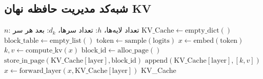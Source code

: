 \subsection{شبه‌کد مدیریت حافظه نهان KV}
\begin{latin}
\begin{algorithm}[H]
\caption{مدیریت حافظه نهان KV با تخصیص صفحه‌بندی شده}
\label{alg:kv_cache}
\begin{algorithmic}[1]
\Require $n$: تعداد لایه‌ها، $h$: تعداد سرها، $d_k$: بعد هر سر
\State $\text{KV\_Cache} \gets \text{empty\_dict}()$
\State $\text{block\_table} \gets \text{empty\_list}()$
    \State $\text{token} \gets \text{sample}(\text{logits})$
    \State $x \gets \text{embed}(\text{token})$
        \State $k, v \gets \text{compute\_kv}(x)$
            \State $\text{block\_id} \gets \text{alloc\_page}()$
            \State $\text{store\_in\_page}(\text{KV\_Cache}[\text{layer}], \text{block\_id})$
        \EndIf
        \State $\text{append}(\text{KV\_Cache}[\text{layer}], [k, v])$
        \State $x \gets \text{forward\_layer}(x, \text{KV\_Cache}[\text{layer}])$
    \EndFor
\EndWhile
\Return KV\_Cache
\end{algorithmic}
\end{algorithm}
\end{latin}